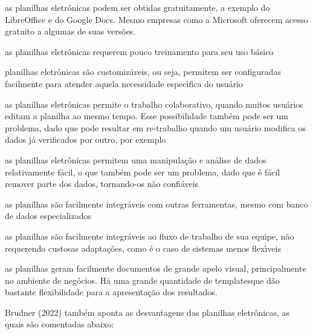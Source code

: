 \documentclass[
12pt,		%
openright,	%
twoside,  %
a4paper,			%
chapter=TITLE,		%
english,			%
french,				%
spanish,			%
brazil				%
]{USPSC-classe/USPSC}
\begin{document}
\begin{alineas}
\item as planilhas eletr\^onicas podem ser obtidas gratuitamente, a exemplo do LibreOffice e do Google Docs. Mesmo empresas como a Microsoft oferecem acesso gratuito a algumas de suas vers\~oes.
\item as planilhas eletr\^onicas requerem pouco treinamento para seu uso b\'asico
\item planilhas eletr\^onicas s\~ao \textquotedbl customiz\'aveis\textquotedbl , ou seja, permitem ser configuradas facilmente para atender aquela necessidade espec\'{\i}fica do usu\'ario
\item as planilhas eletr\^onicas permite o trabalho colaborativo, quando muitos usu\'arios editam a planilha ao mesmo tempo. Esse possibilidade tamb\'em pode ser um problema, dado que pode resultar em re-trabalho quando um usu\'ario modifica os dados j\'a verificados por outro, por exemplo
\item as planilhas eletr\^onicas permitem uma manipula\c{c}\~ao e an\'alise de dados relativamente f\'acil, o que tamb\'em pode ser um problema, dado que \'e f\'acil remover parte dos dados, tornando-os n\~ao confi\'aveis
\item as planilhas s\~ao facilmente integr\'aveis com outras  ferramentas, mesmo com banco de dados especializados
\item as planilhas s\~ao facilmente integr\'aveis ao fluxo de trabalho de sua equipe, n\~ao requerendo custosas adapta\c{c}\~oes, como \'e o caso de sistemas menos flex\'{\i}veis
\item as planilhas geram facilmente documentos de grande apelo visual, principalmente no ambiente de neg\'ocios. H\'a uma grande quantidade de \textquotedbl templates\textquotedbl  que d\~ao bastante flexibilidade para a apresenta\c{c}\~ao dos resultados.
\end{alineas}

 Brudner (2022) tamb\'em aponta as desvantagens das planilhas eletr\^onicas, as quais s\~ao comentadas abaixo:
\end{document}
